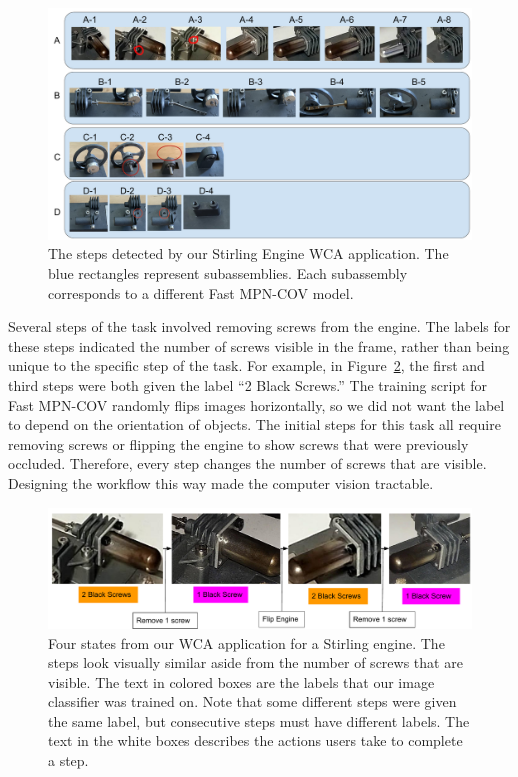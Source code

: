 \begin{figure}
  \includegraphics[width=\columnwidth]{figures/stirling_subassemblies.pdf}
  \caption[The steps detected by our Stirling Engine WCA application]{
    The steps detected by our Stirling Engine WCA application.
    The blue rectangles represent subassemblies.
    Each subassembly corresponds to a different Fast MPN-COV model.
  }\label{fig:stirling_subs}
\end{figure}

Several steps of the task involved removing screws from the engine.
The labels for these steps indicated the number of screws visible in the frame,
rather than being unique to the specific step of the task.
For example, in Figure~\ref{fig:stirling_steps}, the first and third steps
were both given the label ``2 Black Screws.''
The training script for Fast MPN-COV randomly flips images
horizontally, so we did not want the label to depend on the orientation of
objects.
The initial steps for this task all require removing screws or flipping the
engine to show screws that were previously occluded.
Therefore, every step changes the number of screws that are visible.
Designing the workflow this way made the computer vision tractable.

\begin{figure}
  \includegraphics[width=\columnwidth]{figures/stirling_steps.pdf}
  \caption[Four states from our WCA application for a Stirling engine]{
    Four states from our WCA application for a Stirling engine.
    The steps look visually similar aside from the number of screws that are
    visible.
    The text in colored boxes are the labels that our image classifier was
    trained on.
    Note that some different steps were given the same label, but consecutive
    steps must have different labels.
    The text in the white boxes describes the actions users take to complete a
    step.
  }\label{fig:stirling_steps}
\end{figure}

